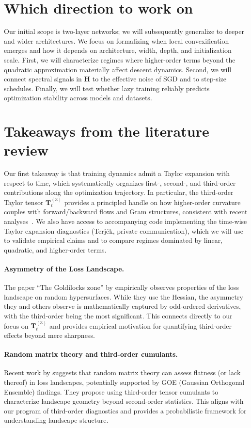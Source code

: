 \documentclass[12pt]{article}
\begin{document}
\section{Which direction to work on}\label{sec:directions}
Our initial scope is two-layer networks; we will subsequently generalize to deeper and wider architectures. We focus on formalizing when local convexification emerges and how it depends on architecture, width, depth, and initialization scale. First, we will characterize regimes where higher-order terms beyond the quadratic approximation materially affect descent dynamics. Second, we will connect spectral signals in \(\bm{H}\) to the effective noise of SGD and to step-size schedules. Finally, we will test whether lazy training reliably predicts optimization stability across models and datasets.

\section{Takeaways from the literature review}\label{sec:takeaways}
Our first takeaway is that training dynamics admit a Taylor expansion with respect to time, which systematically organizes first-, second-, and third-order contributions along the optimization trajectory. In particular, the third-order Taylor tensor \(\bm{T}^{(3)}_{t}\) provides a principled handle on how higher-order curvature couples with forward/backward flows and Gram structures, consistent with recent analyses~\cite{terjek2025featurelearningedgestability}. We also have access to accompanying code implementing the time-wise Taylor expansion diagnostics (Terj\'ek, private communication), which we will use to validate empirical claims and to compare regimes dominated by linear, quadratic, and higher-order terms.

\paragraph{Asymmetry of the Loss Landscape.} The paper ``The Goldilocks zone'' by \cite{fort2018goldilockszonebetterunderstanding} empirically observes properties of the loss landscape on random hypersurfaces. While they use the Hessian, the asymmetry they and others observe is mathematically captured by odd-ordered derivatives, with the third-order being the most significant. This connects directly to our focus on \(\bm{T}^{(3)}_{t}\) and provides empirical motivation for quantifying third-order effects beyond mere sharpness.

\paragraph{Random matrix theory and third-order cumulants.} Recent work by \cite{baskerville2023randommatrixtheoryloss} suggests that random matrix theory can assess flatness (or lack thereof) in loss landscapes, potentially supported by GOE (Gaussian Orthogonal Ensemble) findings. They propose using third-order tensor cumulants to characterize landscape geometry beyond second-order statistics. This aligns with our program of third-order diagnostics and provides a probabilistic framework for understanding landscape structure.
\end{document}

